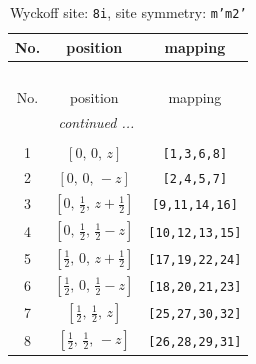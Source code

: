 \documentclass[fleqn,8pt]{jsarticle}
\begin{document}
\begin{longtable}{ccc}
\caption{Wyckoff site: {\tt 8i}, site symmetry: {\tt m'm2'}}
 \\
 \hline \hline
No. & position & mapping \\ \hline \endfirsthead

\multicolumn{2}{l}{\tablename\ \thetable{}} \\
 \hline \hline
No. & position & mapping \\ \hline \endhead

 \hline \hline
\multicolumn{2}{r}{\footnotesize\it continued ...} \\ \endfoot

 \hline \hline
\multicolumn{2}{r}{} \\ \endlastfoot

1 & $\left[ 0,\, 0,\, z \right]$ & {\tt [1,3,6,8]} \\ \hline
2 & $\left[ 0,\, 0,\, - z \right]$ & {\tt [2,4,5,7]} \\ \hline
3 & $\left[ 0,\, \frac{1}{2},\, z + \frac{1}{2} \right]$ & {\tt [9,11,14,16]} \\ \hline
4 & $\left[ 0,\, \frac{1}{2},\, \frac{1}{2} - z \right]$ & {\tt [10,12,13,15]} \\ \hline
5 & $\left[ \frac{1}{2},\, 0,\, z + \frac{1}{2} \right]$ & {\tt [17,19,22,24]} \\ \hline
6 & $\left[ \frac{1}{2},\, 0,\, \frac{1}{2} - z \right]$ & {\tt [18,20,21,23]} \\ \hline
7 & $\left[ \frac{1}{2},\, \frac{1}{2},\, z \right]$ & {\tt [25,27,30,32]} \\ \hline
8 & $\left[ \frac{1}{2},\, \frac{1}{2},\, - z \right]$ & {\tt [26,28,29,31]} \\
\end{longtable}
\renewcommand{\arraystretch}{1.2}
\end{document}
